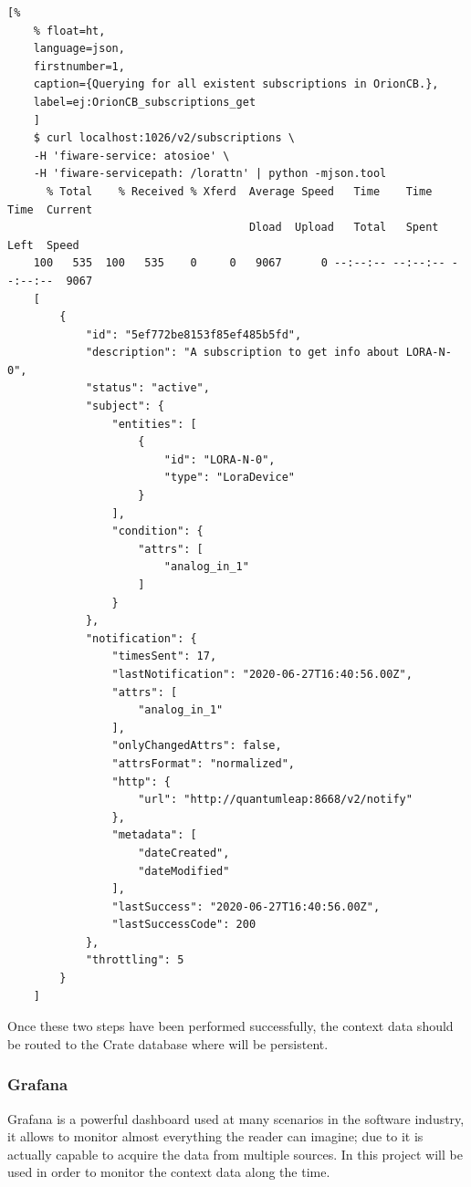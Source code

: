 \documentclass[11pt,a4paper,dvipsnames,twoside]{article}
\begin{document}
\begin{itemize}
  \begin{lstlisting}[%
    % float=ht,
    language=json,
    firstnumber=1,
    caption={Querying for all existent subscriptions in OrionCB.},
    label=ej:OrionCB_subscriptions_get
    ]
    $ curl localhost:1026/v2/subscriptions \
    -H 'fiware-service: atosioe' \
    -H 'fiware-servicepath: /lorattn' | python -mjson.tool
      % Total    % Received % Xferd  Average Speed   Time    Time     Time  Current
                                     Dload  Upload   Total   Spent    Left  Speed
    100   535  100   535    0     0   9067      0 --:--:-- --:--:-- --:--:--  9067
    [
        {
            "id": "5ef772be8153f85ef485b5fd",
            "description": "A subscription to get info about LORA-N-0",
            "status": "active",
            "subject": {
                "entities": [
                    {
                        "id": "LORA-N-0",
                        "type": "LoraDevice"
                    }
                ],
                "condition": {
                    "attrs": [
                        "analog_in_1"
                    ]
                }
            },
            "notification": {
                "timesSent": 17,
                "lastNotification": "2020-06-27T16:40:56.00Z",
                "attrs": [
                    "analog_in_1"
                ],
                "onlyChangedAttrs": false,
                "attrsFormat": "normalized",
                "http": {
                    "url": "http://quantumleap:8668/v2/notify"
                },
                "metadata": [
                    "dateCreated",
                    "dateModified"
                ],
                "lastSuccess": "2020-06-27T16:40:56.00Z",
                "lastSuccessCode": 200
            },
            "throttling": 5
        }
    ]

  \end{lstlisting}

\end{itemize}

Once these two steps have been performed successfully, the context data should be routed to the Crate database where will be persistent. 

\subsubsection{Grafana}\label{sssec:Grafana}
Grafana is a powerful dashboard used at many scenarios in the software industry, it allows to monitor almost everything the reader can imagine; due to it is actually capable to acquire the data from multiple sources. In this project will be used in order to monitor the context data along the time.
\end{document}
